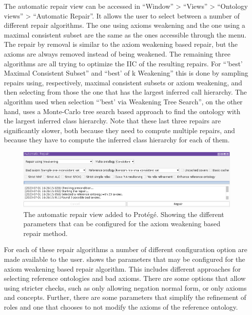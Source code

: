 The automatic repair view can be accessed in ``Window'' > ``Views'' > ``Ontology views'' > ``Automatic Repair''. It allows the user to select between a number of different repair algorithms. The one using axioms weakening and the one using a maximal consistent subset are the same as the ones accessible through the menu. The repair by removal is similar to the axiom weakening based repair, but the axioms are always removed instead of being weakened. The remaining three algorithms are all trying to optimize the IIC of the resulting repairs. For ``'best' Maximal Consistent Subset'' and ``best' of k Weakening'' this is done by sampling repairs using, respectively, maximal consistent subsets or axiom weakening, and then selecting from those the one that has the largest inferred call hierarchy. The algorithm used when selection ``'best' via Weakening Tree Search'', on the other hand, uses a Monte-Carlo tree search based approach to find the ontology with the largest inferred class hierarchy. Note that these last three repairs are significantly slower, both because they need to compute multiple repairs, and because they have to compute the inferred class hierarchy for each of them.

\begin{figure}[htbp]
  \centering
  \includegraphics[width=\textwidth]{resources/protege-guide-config.png}
  \caption{The automatic repair view added to Protégé. Showing the different parameters that can be configured for the axiom weakening based repair method.}
  \label{fig:protege-guide-config}
\end{figure}

For each of these repair algorithms a number of different configuration option are made available to the user.  shows the parameters that may be configured for the axiom weakening based repair algorithm. This includes different approaches for selecting reference ontologies and bad axioms. There are some options that allow using stricter checks, such as only allowing negation normal form, or only \ALC axioms and concepts. Further, there are some parameters that simplify the refinement of roles and one that chooses to not modify the axioms of the reference ontology.

